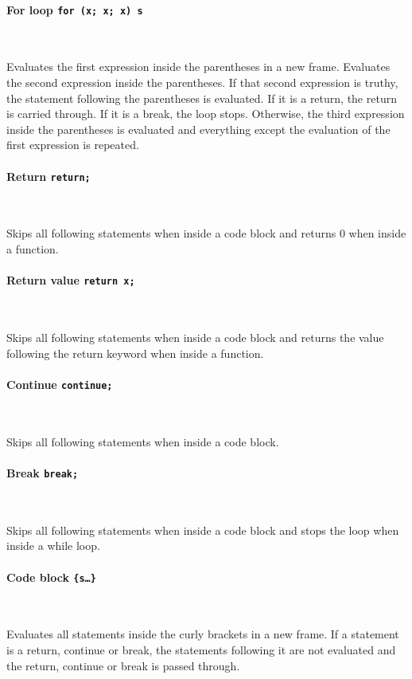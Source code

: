 \paragraph{For loop \quad \texttt{for (x; x; x) s}} \

Evaluates the first expression inside the parentheses in a new frame. Evaluates the second expression inside the parentheses. If that second expression is truthy, the statement following the parentheses is evaluated. If it is a return, the return is carried through. If it is a break, the loop stops. Otherwise, the third expression inside the parentheses is evaluated and everything except the evaluation of the first expression is repeated.

\paragraph{Return \quad \texttt{return;}} \

Skips all following statements when inside a code block and returns 0 when inside a function.

\paragraph{Return value \quad \texttt{return x;}} \

Skips all following statements when inside a code block and returns the value following the return keyword when inside a function.

\paragraph{Continue \quad \texttt{continue;}} \

Skips all following statements when inside a code block.

\paragraph{Break \quad \texttt{break;}} \

Skips all following statements when inside a code block and stops the loop when inside a while loop.

\paragraph{Code block \quad \texttt{\{s\ldots\}}} \

Evaluates all statements inside the curly brackets in a new frame. If a statement is a return, continue or break, the statements following it are not evaluated and the return, continue or break is passed through.

